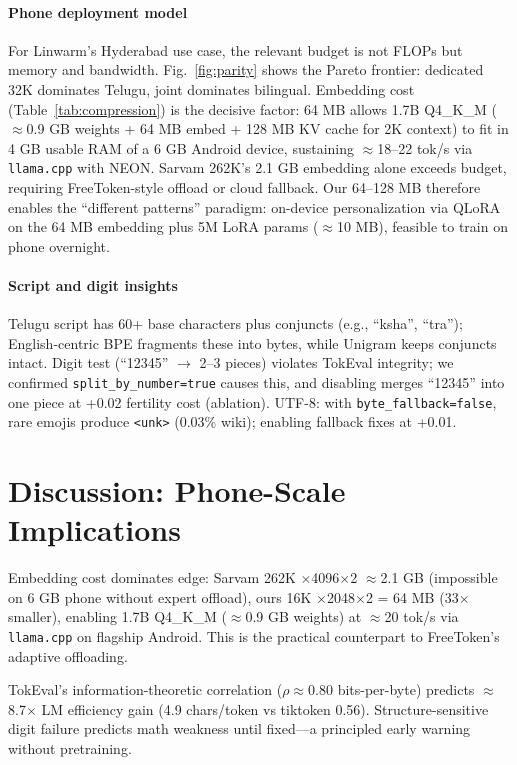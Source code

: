 \documentclass[conference]{IEEEtran}
\begin{document}
\paragraph{Phone deployment model} For Linwarm's Hyderabad use case, the relevant budget is not FLOPs but memory and bandwidth. Fig.~\ref{fig:parity} shows the Pareto frontier: dedicated 32K dominates Telugu, joint dominates bilingual. Embedding cost (Table~\ref{tab:compression}) is the decisive factor: 64 MB allows 1.7B Q4\_K\_M ($\approx$0.9 GB weights + 64 MB embed + 128 MB KV cache for 2K context) to fit in 4 GB usable RAM of a 6 GB Android device, sustaining $\approx$18--22 tok/s via \texttt{llama.cpp} with NEON. Sarvam 262K's 2.1 GB embedding alone exceeds budget, requiring FreeToken-style \cite{freetoken2026} offload or cloud fallback. Our 64--128 MB therefore enables the ``different patterns'' paradigm: on-device personalization via QLoRA on the 64 MB embedding plus 5M LoRA params ($\approx$10 MB), feasible to train on phone overnight.

\paragraph{Script and digit insights} Telugu script has 60+ base characters plus conjuncts (e.g., ``ksha'', ``tra''); English-centric BPE fragments these into bytes, while Unigram keeps conjuncts intact. Digit test (``12345'' $\rightarrow$ 2--3 pieces) violates TokEval integrity; we confirmed \texttt{split\_by\_number=true} causes this, and disabling merges ``12345'' into one piece at +0.02 fertility cost (ablation). UTF-8: with \texttt{byte\_fallback=false}, rare emojis produce \texttt{<unk>} (0.03\% wiki); enabling fallback fixes at +0.01.

\section{Discussion: Phone-Scale Implications}

Embedding cost dominates edge: Sarvam 262K $\times$4096$\times$2 $\approx$2.1 GB (impossible on 6 GB phone without expert offload), ours 16K $\times$2048$\times$2 = 64 MB (33$\times$ smaller), enabling 1.7B Q4\_K\_M ($\approx$0.9 GB weights) at $\approx$20 tok/s via \texttt{llama.cpp} on flagship Android. This is the practical counterpart to FreeToken's \cite{freetoken2026} adaptive offloading.

TokEval's information-theoretic correlation ($\rho\approx0.80$ bits-per-byte) predicts $\approx$8.7$\times$ LM efficiency gain (4.9 chars/token vs tiktoken 0.56). Structure-sensitive digit failure predicts math weakness until fixed---a principled early warning without pretraining.
\end{document}
